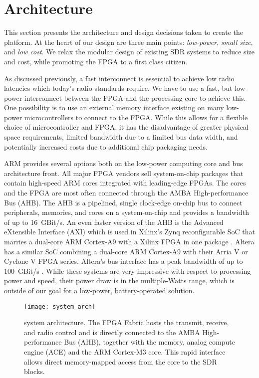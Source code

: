 \section{Architecture}
\label{sec:arch}

This section presents the architecture and design decisions taken to
create the \sdr platform. At the heart of our design are three main
points: \emph{low-power}, \emph{small size}, and \emph{low cost}. We
relax the modular design of existing SDR systems to reduce size and
cost, while promoting the FPGA to a first class citizen.

As discussed previously, a fast interconnect is essential to achieve
low radio latencies which today's radio standards require. We have to
use a fast, but low-power interconnect between the FPGA and the
processing core to achieve this. One possibility is to use an external
memory interface existing on many low-power microcontrollers to
connect to the FPGA. While this allows for a flexible choice of
microcontroller and FPGA, it has the disadvantage of greater physical
space requirements, limited bandwidth due to a limited bus data width,
and potentially increased costs due to additional chip packaging
needs.

ARM provides several options both on the low-power computing core and
bus architecture front. All major FPGA vendors sell system-on-chip
packages that contain high-speed ARM cores integrated with
leading-edge FPGAs. The cores and the FPGA are most often connected
through the AMBA High-performance Bus (AHB). The AHB is a pipelined,
single clock-edge on-chip bus to connect peripherals, memories, and
cores on a system-on-chip and provides a bandwidth of up to
16~GBit/s. An even faster version of the AHB is the Advanced
eXtensible Interface (AXI) which is used in Xilinx's Zynq
reconfigurable SoC that marries a dual-core ARM Cortex-A9 with a
Xilinx FPGA in one package \cite{zynq}. Altera has a similar SoC
combining a dual-core ARM Cortex-A9 with their Arria V or Cyclone V
FPGA series. Altera's bus interface has a peak bandwidth of up to
100~GBit/s \cite{alteraSoC}. While these systems are very impressive
with respect to processing power and speed, their power draw is in the
multiple-Watts range, which is outside of our goal for a low-power,
battery-operated solution.

\begin{figure}[t]
\texttt{[image: system\_arch]}
\caption{\sdr system architecture. The FPGA Fabric hosts the transmit,
receive, and radio control and is directly connected to the AMBA
High-performance Bus (AHB), together with the memory, analog compute engine
(ACE) and the ARM Cortex-M3 core. This rapid interface allows direct
memory-mapped access from the core to the SDR blocks. }
\label{fig:system_arch}
\end{figure}

